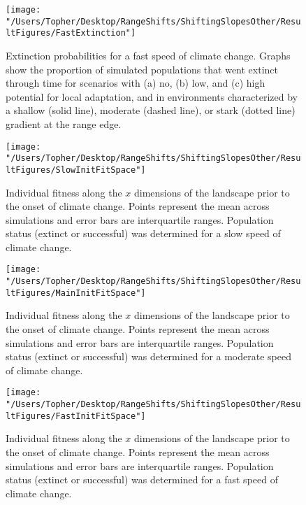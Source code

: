 \documentclass[11pt]{article}
\begin{document}
\begin{figure}[h!]
\texttt{[image: "/Users/Topher/Desktop/RangeShifts/ShiftingSlopesOther/ResultFigures/FastExtinction"]}
\caption{Extinction probabilities for a fast speed of climate change. Graphs show the proportion of simulated populations that went extinct through time for scenarios with (a) no, (b) low, and (c) high potential for local adaptation, and in environments characterized by a shallow (solid line), moderate (dashed line), or stark (dotted line) gradient at the range edge.}
\label{Fig:ExtProbFast}
\end{figure}

\clearpage

\begin{figure}[h!]
\texttt{[image: "/Users/Topher/Desktop/RangeShifts/ShiftingSlopesOther/ResultFigures/SlowInitFitSpace"]}
\caption{Individual fitness along the $x$ dimensions of the landscape prior to the onset of climate change. Points represent the mean across simulations and error bars are interquartile ranges. Population status (extinct or successful) was determined for a slow speed of climate change.}
\label{Fig:InitFitSlow}
\end{figure}

\clearpage

\begin{figure}[h!]
\texttt{[image: "/Users/Topher/Desktop/RangeShifts/ShiftingSlopesOther/ResultFigures/MainInitFitSpace"]}
\caption{Individual fitness along the $x$ dimensions of the landscape prior to the onset of climate change. Points represent the mean across simulations and error bars are interquartile ranges. Population status (extinct or successful) was determined for a moderate speed of climate change.}
\label{Fig:InitFit}
\end{figure}

\clearpage

\begin{figure}[h!]
\texttt{[image: "/Users/Topher/Desktop/RangeShifts/ShiftingSlopesOther/ResultFigures/FastInitFitSpace"]}
\caption{Individual fitness along the $x$ dimensions of the landscape prior to the onset of climate change. Points represent the mean across simulations and error bars are interquartile ranges. Population status (extinct or successful) was determined for a fast speed of climate change.}
\label{Fig:InitFitFast}
\end{figure}

\clearpage
\end{document}
